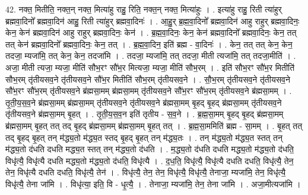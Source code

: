 \documentclass[17pt]{extarticle}
\begin{document}
42. नक्त॒ मितीति॒ नक्त॒न् नक्त॒ मित्या॑हु राहु॒ रिति॒ नक्त॒न् नक्त॒ मित्या॑हुः । . इत्या॑हु राहु॒ रिती त्या॑हुर् ब्रह्मवा॒दिनो᳚ ब्रह्मवा॒दिन॑ आहु॒ रिती त्या॑हुर् ब्रह्मवा॒दिनः॑ । . आ॒हु॒र् ब्र॒ह्म॒वा॒दिनो᳚ ब्रह्मवा॒दिन॑ आहु राहुर् ब्रह्मवा॒दिनः॒ केन॒ केन॑ ब्रह्मवा॒दिन॑ आहु राहुर् ब्रह्मवा॒दिनः॒ केन॑ । . ब्र॒ह्म॒वा॒दिनः॒ केन॒ केन॑ ब्रह्मवा॒दिनो᳚ ब्रह्मवा॒दिनः॒ केन॒ तत् तत् केन॑ ब्रह्मवा॒दिनो᳚ ब्रह्मवा॒दिनः॒ केन॒ तत् । . ब्र॒ह्म॒वा॒दिन॒ इति॑ ब्रह्म - वा॒दिनः॑ । . केन॒ तत् तत् केन॒ केन॒ तदजा॒ म्यजा॑मि॒ तत् केन॒ केन॒ तदजा॑मि । . तदजा॒ म्यजा॑मि॒ तत् तदजा॒ मीती त्यजा॑मि॒ तत् तदजा॒मीति॑ । . अजा॒ मीती त्यजा॒ म्यजा॒ मीति॑ सौभ॒रꣳ सौ॑भ॒र मित्यजा॒ म्यजा॒ मीति॑ सौभ॒रम् । . इति॑ सौभ॒रꣳ सौ॑भ॒र मितीति॑ सौभ॒रम् तृ॑तीयसव॒ने तृ॑तीयसव॒ने सौ॑भ॒र मितीति॑ सौभ॒रम् तृ॑तीयसव॒ने । . सौ॒भ॒रम् तृ॑तीयसव॒ने तृ॑तीयसव॒ने सौ॑भ॒रꣳ सौ॑भ॒रम् तृ॑तीयसव॒ने ब्र॑ह्मसा॒मम् ब्र॑ह्मसा॒मम् तृ॑तीयसव॒ने सौ॑भ॒रꣳ सौ॑भ॒रम् तृ॑तीयसव॒ने ब्र॑ह्मसा॒मम् । . तृ॒ती॒य॒स॒व॒ने ब्र॑ह्मसा॒मम् ब्र॑ह्मसा॒मम् तृ॑तीयसव॒ने तृ॑तीयसव॒ने ब्र॑ह्मसा॒मम् बृ॒हद् बृ॒हद् ब्र॑ह्मसा॒मम् तृ॑तीयसव॒ने तृ॑तीयसव॒ने ब्र॑ह्मसा॒मम् बृ॒हत् । . तृ॒ती॒य॒स॒व॒न इति॑ तृतीय - स॒व॒ने । . ब्र॒ह्म॒सा॒मम् बृ॒हद् बृ॒हद् ब्र॑ह्मसा॒मम् ब्र॑ह्मसा॒मम् बृ॒हत् तत् तद् बृ॒हद् ब्र॑ह्मसा॒मम् ब्र॑ह्मसा॒मम् बृ॒हत् तत् । . ब्र॒ह्म॒सा॒ममिति॑ ब्रह्म - सा॒मम् । . बृ॒हत् तत् तद् बृ॒हद् बृ॒हत् तन् म॑द्ध्य॒तो म॑द्ध्य॒त स्तद् बृ॒हद् बृ॒हत् तन् म॑द्ध्य॒तः । . तन् म॑द्ध्य॒तो म॑द्ध्य॒त स्तत् तन् म॑द्ध्य॒तो द॑धति दधति मद्ध्य॒त स्तत् तन् म॑द्ध्य॒तो द॑धति । . म॒द्ध्य॒तो द॑धति दधति मद्ध्य॒तो म॑द्ध्य॒तो द॑धति॒ विधृ॑त्यै॒ विधृ॑त्यै दधति मद्ध्य॒तो म॑द्ध्य॒तो द॑धति॒ विधृ॑त्यै । . द॒ध॒ति॒ विधृ॑त्यै॒ विधृ॑त्यै दधति दधति॒ विधृ॑त्यै॒ तेन॒ तेन॒ विधृ॑त्यै दधति दधति॒ विधृ॑त्यै॒ तेन॑ । . विधृ॑त्यै॒ तेन॒ तेन॒ विधृ॑त्यै॒ विधृ॑त्यै॒ तेनाजा॒ म्यजा॑मि॒ तेन॒ विधृ॑त्यै॒ विधृ॑त्यै॒ तेना जा॑मि । . विधृ॑त्या॒ इति॒ वि - धृ॒त्यै॒ । . तेनाजा॒ म्यजा॑मि॒ तेन॒ तेना जा॑मि । . अजा॒मीत्यजा॑मि । \newline
\pagebreak
{}
\end{document}
